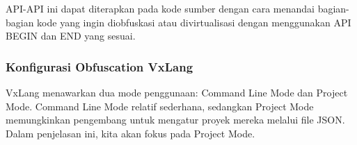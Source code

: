 \begin{itemize}
\begin{minted}
            VL_VIRTUALIZATION_BEGIN;

            printf("Virtualization Test!")

            VL_VIRTUALIZATION_END;

          }
    \end{verbatim}

\end{itemize}

API-API ini dapat diterapkan pada kode sumber dengan cara menandai bagian-bagian kode yang ingin diobfuskasi atau divirtualisasi dengan menggunakan API BEGIN dan END yang sesuai.

\subsubsection{Konfigurasi Obfuscation VxLang}
VxLang menawarkan dua mode penggunaan: Command Line Mode dan Project Mode. Command Line Mode relatif sederhana, sedangkan Project Mode memungkinkan pengembang untuk mengatur proyek mereka melalui file JSON. Dalam penjelasan ini, kita akan fokus pada Project Mode.

